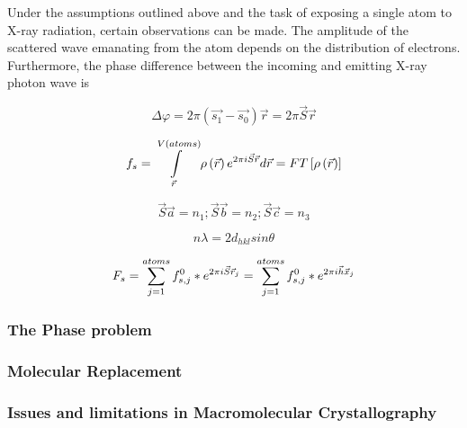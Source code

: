 Under the assumptions outlined above and the task of exposing a single atom to X-ray radiation, certain observations can be made. The amplitude of the scattered wave emanating from the atom depends on the distribution of electrons. Furthermore, the phase difference between the incoming and emitting X-ray photon wave is 


\begin{equation}
    \label{eq:phase_difference}
    \Delta\varphi=2\pi\left(\vec{s_1}-\vec{s_0}\right)\vec{r}=2\pi\vec{S}\vec{r}
\end{equation}

\begin{equation}
    \label{eq:atomic_scattering_factor}
    f_s=\int\limits_{\vec{r}}^{V(atoms)}\rho\left(\vec{r}\right)e^{2\pi\\i\vec{S}\vec{r}}d\vec{r}=FT\left[\rho\left(\vec{r}\right)\right]
\end{equation}

\begin{equation}
    \label{eq:laue_equations}
    \vec{S}\vec{a}=n_1; \vec{S}\vec{b}=n_2; \vec{S}\vec{c}=n_3
\end{equation}

\begin{equation}
    \label{eq:bragg_law}
    n\lambda=2d_{hkl}sin\theta
\end{equation}

\begin{equation}
    \label{eq:structure_factors}
    F_s=\sum_{j=1}^{atoms}f_{s,j}^0*e^{2\pi\\i\vec{S}\vec{r}_j}=\sum_{j=1}^{atoms}f_{s,j}^0*e^{2\pi\\i\vec{h}\vec{x}_j}
\end{equation}

\subsubsection{The Phase problem}
\subsubsection{Molecular Replacement}
\subsubsection{Issues and limitations in Macromolecular Crystallography}

